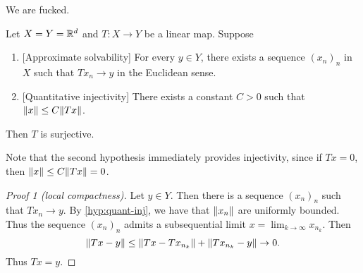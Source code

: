 We are fucked.
\begin{theorem}
    Let $X = Y = \mathbb{R}^d$ and $T\colon X \to Y$ be a linear map.
    Suppose
    \begin{enumerate}[label=(H\arabic*)]
        \item{} [Approximate solvability] \label{hyp:approx-solv}
            For every $y \in Y$, there exists a sequence $(x_n)_n$ in $X$
            such that $T x_n \to y$ in the Euclidean sense.
        \item{} [Quantitative injectivity] \label{hyp:quant-inj}
            There exists a constant $C > 0$ such that
            $\lVert x\rVert \le C \lVert Tx\rVert$.
    \end{enumerate}
    Then $T$ is surjective.
\end{theorem}
Note that the second hypothesis immediately provides injectivity, since
if $Tx = 0$, then $\lVert x\rVert \le C \lVert Tx\rVert = 0$.
\begin{proof}[Proof 1 (local compactness)]
    Let $y \in Y$.
    Then there is a sequence $(x_n)_n$ such that $Tx_n \to y$.
    By \cref{hyp:quant-inj}, we have that $\lVert x_n\rVert$ are uniformly
    bounded.
    Thus the sequence $(x_n)_n$ admits a subsequential limit
    $x = \lim_{k \to \infty} x_{n_k}$.
    Then \[
        \lVert Tx - y\rVert \le \lVert Tx - Tx_{n_k}\rVert + \lVert Tx_{n_k} - y\rVert \to 0.
    \] Thus $Tx = y$.
\end{proof}
